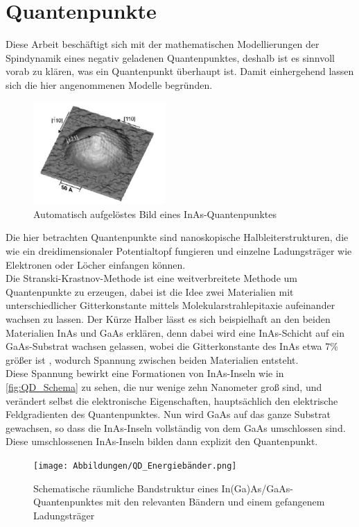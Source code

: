 \chapter{Quantenpunkte}

\noindent Diese Arbeit beschäftigt sich mit der mathematischen Modellierungen der Spindynamik eines negativ geladenen
Quantenpunktes, deshalb ist es sinnvoll vorab zu klären, was ein Quantenpunkt überhaupt ist. Damit einhergehend lassen sich die hier angenommenen Modelle begründen.\\
\begin{figure}[h!]
    \centering
    \includegraphics[width = 0.45\textwidth]{Abbildungen/einQD.png}
    \caption{Automatisch aufgelöstes Bild eines InAs-Quantenpunktes\cite{doi:10.1063/1.1365101}}
    \label{fig:QD_Schema}
\end{figure}

\noindent Die hier betrachten Quantenpunkte sind nanoskopische Halbleiterstrukturen, die wie ein dreidimensionaler Potentialtopf fungieren
und einzelne Ladungsträger wie Elektronen oder Löcher einfangen können.\\
Die Stranski-Krastnov-Methode ist eine weitverbreitete Methode um Quantenpunkte zu erzeugen, dabei ist die Idee zwei Materialien mit 
unterschiedlicher Gitterkonstante mittels Molekularstrahlepitaxie aufeinander wachsen zu lassen. Der Kürze Halber lässt es sich 
beispielhaft an den beiden Materialien InAs und GaAs erklären, denn dabei wird eine InAs-Schicht auf ein GaAs-Substrat wachsen gelassen, 
wobei die Gitterkonstante des InAs etwa 7\% größer ist \cite{RevModPhys.85.79}, wodurch Spannung zwischen beiden Materialien entsteht. \\
\noindent Diese Spannung bewirkt eine Formationen von InAs-Inseln wie in \autoref{fig:QD_Schema} zu sehen, die nur wenige zehn 
Nanometer groß sind, und verändert selbst die elektronische Eigenschaften, hauptsächlich den elektrische Feldgradienten des 
Quantenpunktes. Nun wird GaAs auf das ganze Substrat gewachsen, so dass die InAs-Inseln vollständig von 
dem GaAs umschlossen sind. Diese umschlossenen InAs-Inseln bilden dann explizit den Quantenpunkt.\\
\begin{figure}
   \centering
    \texttt{[image: Abbildungen/QD\_Energiebänder.png]}
    \caption{Schematische räumliche Bandstruktur eines In(Ga)As/GaAs-Quantenpunktes mit den relevanten Bändern und einem 
    gefangenem Ladungsträger}
    \label{fig:QD_Bandstruktur}
\end{figure}


